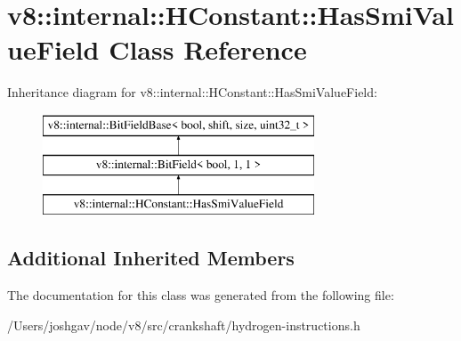 \hypertarget{classv8_1_1internal_1_1_h_constant_1_1_has_smi_value_field}{}\section{v8\+:\+:internal\+:\+:H\+Constant\+:\+:Has\+Smi\+Value\+Field Class Reference}
\label{classv8_1_1internal_1_1_h_constant_1_1_has_smi_value_field}
Inheritance diagram for v8\+:\+:internal\+:\+:H\+Constant\+:\+:Has\+Smi\+Value\+Field\+:\begin{figure}[H]
\begin{center}
\leavevmode
\includegraphics[height=3.000000cm]{classv8_1_1internal_1_1_h_constant_1_1_has_smi_value_field}
\end{center}
\end{figure}
\subsection*{Additional Inherited Members}


The documentation for this class was generated from the following file\+:\begin{DoxyCompactItemize}
\item 
/\+Users/joshgav/node/v8/src/crankshaft/hydrogen-\/instructions.\+h\end{DoxyCompactItemize}
